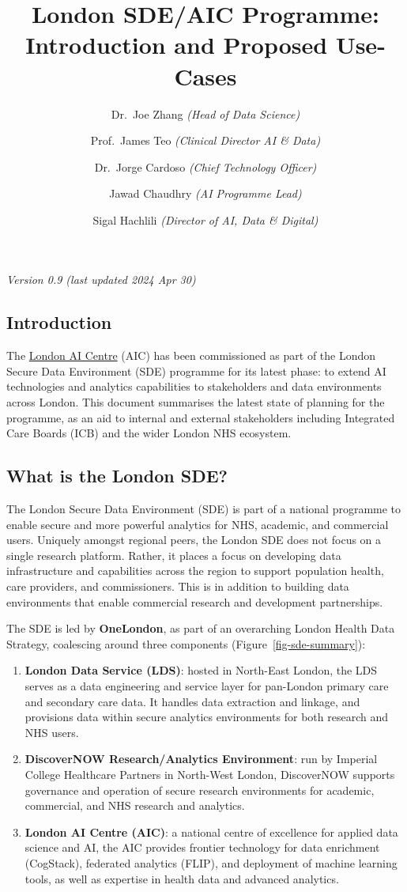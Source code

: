 \documentclass[
  letterpaper,
  DIV=11,
  numbers=noendperiod]{scrartcl}
\title{London SDE/AIC Programme: Introduction and Proposed Use-Cases}
\author{Dr.~Joe Zhang \emph{(Head of Data Science)} \and Prof.~James Teo
\emph{(Clinical Director AI \& Data)} \and Dr.~Jorge Cardoso
\emph{(Chief Technology Officer)} \and Jawad Chaudhry \emph{(AI
Programme Lead)} \and Sigal Hachlili \emph{(Director of AI, Data \&
Digital)}}
\date{}
\begin{document}
\maketitle

\emph{Version 0.9 (last updated 2024 Apr 30)}

\subsection{Introduction}\label{introduction}

The \href{https://www.aicentre.co.uk/}{London AI Centre} (AIC) has been
commissioned as part of the London Secure Data Environment (SDE)
programme for its latest phase: to extend AI technologies and analytics
capabilities to stakeholders and data environments across London. This
document summarises the latest state of planning for the programme, as
an aid to internal and external stakeholders including Integrated Care
Boards (ICB) and the wider London NHS ecosystem.

\subsection{What is the London SDE?}\label{what-is-the-london-sde}

The London Secure Data Environment (SDE) is part of a national programme
to enable secure and more powerful analytics for NHS, academic, and
commercial users. Uniquely amongst regional peers, the London SDE does
not focus on a single research platform. Rather, it places a focus on
developing data infrastructure and capabilities across the region to
support population health, care providers, and commissioners. This is in
addition to building data environments that enable commercial research
and development partnerships.

The SDE is led by \textbf{OneLondon}, as part of an overarching London
Health Data Strategy, coalescing around three components
(Figure~\ref{fig-sde-summary}):

\begin{enumerate}
\def\labelenumi{(\arabic{enumi})}
\item
  \textbf{London Data Service (LDS)}: hosted in North-East London, the
  LDS serves as a data engineering and service layer for pan-London
  primary care and secondary care data. It handles data extraction and
  linkage, and provisions data within secure analytics environments for
  both research and NHS users.
\item
  \textbf{DiscoverNOW Research/Analytics Environment}: run by Imperial
  College Healthcare Partners in North-West London, DiscoverNOW supports
  governance and operation of secure research environments for academic,
  commercial, and NHS research and analytics.
\item
  \textbf{London AI Centre (AIC)}: a national centre of excellence for
  applied data science and AI, the AIC provides frontier technology for
  data enrichment (CogStack), federated analytics (FLIP), and deployment
  of machine learning tools, as well as expertise in health data and
  advanced analytics.
\end{enumerate}
\end{document}
